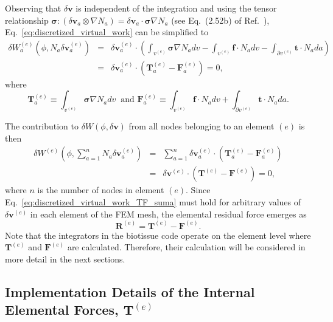 Observing that $\delta \pmb{v}$ is independent of the integration and using the tensor relationship $\pmb{\sigma}:(\delta \pmb{v}_a \otimes \nabla N_a) = \delta \pmb{v}_a \cdot \pmb{\sigma} \nabla N_a$ (see Eq.\ (2.52b) of Ref.\ \cite{JavierBonet:2008uxa}), Eq.\ \eqref{eq:discretized_virtual_work} can be simplified to
%
\begin{eqnarray}
\delta W^{(e)}_a(\phi,N_a\delta\pmb{v}^{(e)}_a) &=& \delta \pmb{v}^{(e)}_a \cdot \left( \int_{v^{(e)}} \pmb{\sigma} \nabla N_a dv - \int_{v^{(e)}} \pmb{f} \cdot N_a dv - \int_{\partial v^{(e)}} \pmb{t} \cdot N_a da \right) \nonumber\\
%
&=& \delta \pmb{v}^{(e)}_a \cdot \left( \pmb{T}^{(e)}_a - \pmb{F}^{(e)}_a \right) = 0,
\label{eq:discretized_virtual_work_TF}
\end{eqnarray}
%
where
%
\begin{equation}
\pmb{T}^{(e)}_a \equiv \int_{v^{(e)}} \pmb{\sigma}\nabla N_a dv \ \text{ and } \pmb{F}^{(e)}_a \equiv \int_{v^{(e)}} \pmb{f} \cdot N_a  dv + \int_{\partial v^{(e)}} \pmb{t} \cdot N_a  da.
\label{eq:TF_definition}
\end{equation}
%

The contribution to $\delta W(\phi,\delta \pmb{v})$ from all nodes belonging to an element $(e)$ is then
%
\begin{eqnarray}
\delta W^{(e)}(\phi,\sum_{a=1}^n N_a \delta\pmb{v}^{(e)}_a) &=& \sum_{a=1}^n\delta \pmb{v}^{(e)}_a \cdot \left( \pmb{T}^{(e)}_a - \pmb{F}^{(e)}_a \right) \nonumber\\
%
&=& \delta \pmb{v}^{(e)} \cdot \left( \pmb{T}^{(e)} - \pmb{F}^{(e)} \right) = 0,
\label{eq:discretized_virtual_work_TF_suma}
\end{eqnarray}
%
where $n$ is the number of nodes in element $(e)$. Since Eq.\ \eqref{eq:discretized_virtual_work_TF_suma} must hold for arbitrary values of $\delta \pmb{v}^{(e)}$ in each element of the FEM mesh, the elemental residual force emerges as
%
\begin{equation}
\pmb{R}^{(e)} = \pmb{T}^{(e)} - \pmb{F}^{(e)}.
\label{eq:R^e}
\end{equation}
%
Note that the integrators in the biotissue code operate on the element level where $\pmb{T}^{(e)}$ and $\pmb{F}^{(e)}$ are calculated. Therefore, their calculation will be considered in more detail in the next sections.

\subsection{Implementation Details of the Internal Elemental Forces, $\pmb{T}^{(e)}$}


